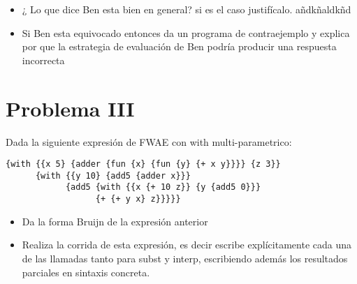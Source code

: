 \documentclass[a4paper]{article}
\begin{document}
\begin{itemize}
\item ¿ Lo que dice Ben esta bien en general? si es el caso justifícalo.
añdkñaldkñd
\item Si Ben esta equivocado entonces da un programa de contraejemplo y explica por que la estrategia de evaluación de Ben podría producir una respuesta incorrecta
\end{itemize}

\section{Problema III}
Dada la siguiente expresión de FWAE con with multi-parametrico:
\begin{verbatim}
{with {{x 5} {adder {fun {x} {fun {y} {+ x y}}}} {z 3}}
      {with {{y 10} {add5 {adder x}}}
            {add5 {with {{x {+ 10 z}} {y {add5 0}}}
                  {+ {+ y x} z}}}}}
\end{verbatim}
\begin{itemize}
\item Da la forma Bruijn de la expresión anterior
\item Realiza la corrida de esta expresión, es decir escribe explícitamente cada una de las llamadas tanto para subst y interp, escribiendo además los resultados parciales en sintaxis concreta.
\end{itemize}
\end{document}
